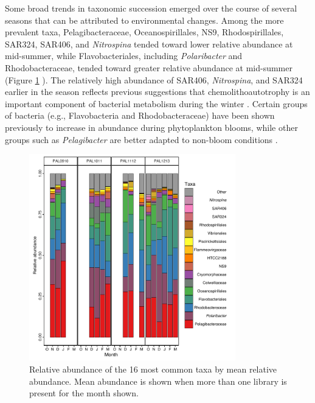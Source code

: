 Some broad trends in taxonomic succession emerged over the course of several seasons that can be attributed to environmental changes. Among the more prevalent taxa, Pelagibacteraceae, Oceanospirillales, NS9, Rhodospirillales, SAR324, SAR406, and \emph{Nitrospina} tended toward lower relative abundance at mid-summer, while Flavobacteriales, including \emph{Polaribacter} and Rhodobacteraceae, tended toward greater relative abundance at mid-summer (Figure \ref{fig:ch4:taxa} ). The relatively high abundance of SAR406, \emph{Nitrospina}, and SAR324 earlier in the season reflects previous suggestions that chemolithoautotrophy is an important component of bacterial metabolism during the winter \citep{grwddecm12,williams2012metaproteomic,manganelli2009major,wright2014genomic,Spieck2014-sp,Sheik2014-yg}. Certain groups of bacteria (e.g., Flavobacteria and Rhodobacteraceae) have been shown previously to increase in abundance during phytoplankton blooms, while other groups such as \emph{Pelagibacter} are better adapted to non-bloom conditions \citep{williams2013role,Buchan2014-yh,Voget2015-ch}. 

\begin{figure}[ht!] 
\centering 
\includegraphics[width=0.8\textwidth]{Chapter_5_LTER/Figures/Figure_10_taxa_barplot}
\caption[Relative abundance of the 16 most common taxa.]{Relative abundance of the 16 most common taxa by mean relative abundance. Mean abundance is shown when more than one library is present for the month shown.} 
\label{fig:ch4:taxa} 
\end{figure}

